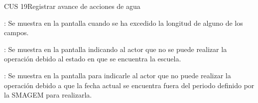 \begin{UseCase}{CUS 19}{Registrar avance de acciones de agua}
{\begin{UClist}
	    \UCli {}: Se muestra en la pantalla  cuando se ha excedido la longitud de alguno de los campos.	
	    
	    \UCli  {}: Se muestra en la pantalla  indicando al actor que no se puede realizar la operación debido al estado en que se encuentra la escuela.
	    
	    \UCli {}: Se muestra en la pantalla  para indicarle al actor que no puede realizar la operación debido a que la fecha actual se encuentra fuera del periodo definido por la SMAGEM para realizarla.
	\end{UClist}
    }

    


\end{UseCase}



